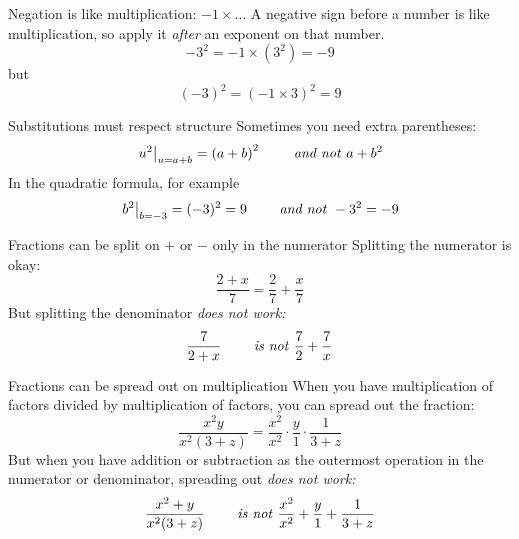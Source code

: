 
\begin{WarningBox}{Negation is like multiplication: $-1\times \dots$}
 A negative sign before a number is like multiplication,
 so apply it \emph{after} an exponent on that number.
 \begin{equation*}
  -3^2 = -1 \times (3^2) = -9
 \end{equation*}
 but
 \begin{equation*}
  (-3)^2 = (-1 \times 3)^2 = 9
 \end{equation*}
\end{WarningBox}
\begin{WarningBox}{Substitutions must respect structure}
 Sometimes you need extra parentheses:
 \begin{equation*}
  \left.u^2\right|_{u = a + b} = \left(a + b\right)^2 \qquad \text{ \emph{and not} } a + b^2
 \end{equation*}
 In the quadratic formula, for example
 \begin{equation*}
  \left.b^2\right|_{b = -3} = (-3)^2 = 9 \qquad \text{ \emph{and not} } -3^2 = -9
 \end{equation*}
\end{WarningBox}
\begin{WarningBox}{Fractions can be split on $+$ or $-$ only in the numerator}
 Splitting the numerator is okay:
 \begin{equation*}
  \frac{2 + x}{7} = \frac{2}{7} + \frac{x}{7}
 \end{equation*}
 But splitting the denominator \emph{does not work:}
 \begin{equation*}
  \frac{7}{2 + x} \qquad \text{ \emph{is not} } \frac{7}{2} + \frac{7}{x}
 \end{equation*}
\end{WarningBox}
\begin{WarningBox}{Fractions can be spread out on multiplication}
 When you have multiplication of factors divided by multiplication of factors,
 you can spread out the fraction:
 \begin{equation*}
  \frac{x^2 y}{x^2 (3 + z)}
  = \frac{x^2}{x^2} \cdot \frac{y}{1} \cdot \frac{1}{3 + z}
 \end{equation*}
 But when you have addition or subtraction as the outermost operation in the numerator or denominator, spreading out \emph{does not work:}
 \begin{equation*}
  \frac{x^2 + y}{x^2 (3 + z)}
  \qquad \text{ \emph{is not} }
  \frac{x^2}{x^2} + \frac{y}{1} + \frac{1}{3 + z}
 \end{equation*}
\end{WarningBox}
